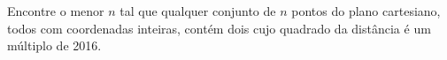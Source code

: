 Encontre o menor $n$ tal que qualquer conjunto de $n$ pontos do plano cartesiano, todos com coordenadas inteiras, contém dois cujo quadrado da distância é um múltiplo de 2016.